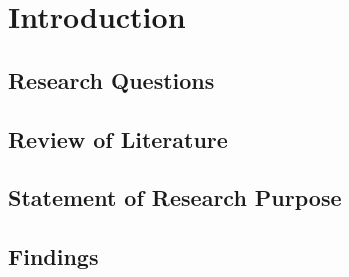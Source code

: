 \pagebreak
\section{Introduction}
\label{ch:Intro}  %

\subsection{Research Questions}
\subsection{Review of Literature}
\subsection{Statement of Research Purpose}
\subsection{Findings}

